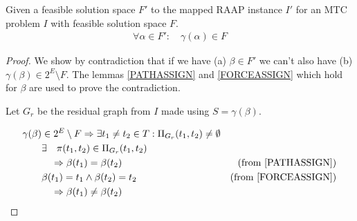 \documentclass{article}
\begin{document}
\begin{lemma}
Given a feasible solution space $F'$ to the mapped RAAP instance $I'$ for an MTC problem $I$ with feasible solution space $F$.
\begin{align}
	\nonumber \forall \alpha \in F' : \quad \gamma(\alpha) \in F
\end{align}
\end{lemma}

\begin{proof}
We show by contradiction that if we have (a) $\beta \in F'$ we can't also have (b) $\gamma(\beta) \in 2^E \setminus F$.
The lemmas \ref{PATHASSIGN} and \ref{FORCEASSIGN} which hold for $\beta$ are used to prove the contradiction.

Let $G_r$ be the residual graph from $I$ made using $S = \gamma(\beta)$.

\begin{align}
	\nonumber \gamma(\beta) & \in 2^E \setminus F \Rightarrow \exists t_1\neq t_2 \in T : \Pi_{G_r}(t_1, t_2) \neq \emptyset \\
	\nonumber & \exists \quad \pi(t_1, t_2) \in \Pi_{G_r}(t_1, t_2) \\
	\nonumber & \quad \Rightarrow \beta(t_1) = \beta(t_2) & \mbox{(from \ref{PATHASSIGN})}\\
	\nonumber & \beta(t_1) = t_1 \wedge \beta(t_2) = t_2 & \mbox{(from \ref{FORCEASSIGN})} \\
	\nonumber & \quad \Rightarrow \beta(t_1) \neq \beta(t_2)
\end{align}

\end{proof}



\end{document}
